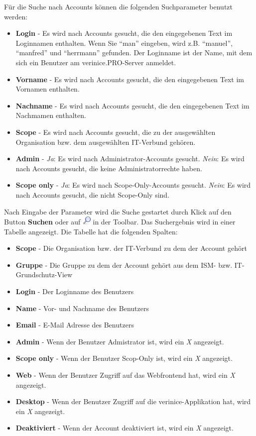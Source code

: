 \documentclass[a4paper,10pt]{book}
\begin{document}
Für die Suche nach Accounts können die folgenden Suchparameter benutzt werden:
\begin{itemize}
\item \textbf{Login} - Es wird nach Accounts gesucht, die den eingegebenen Text
im Loginnamen enthalten. Wenn Sie ``man'' eingeben, wird z.B. ``manuel'',
``manfred'' und ``herrmann'' gefunden. Der Loginname ist der Name, mit dem sich
ein Benutzer am verinice.\textsc{PRO}-Server anmeldet.
\item \textbf{Vorname} - Es wird nach Accounts gesucht, die den eingegebenen
Text im Vornamen enthalten.
\item \textbf{Nachname} - Es wird nach Accounts gesucht, die den eingegebenen
Text im Nachmamen enthalten.
\item \textbf{Scope} - Es wird nach Accounts gesucht, die zu der ausgewählten
Organisation bzw. dem ausgewählten IT-Verbund gehören.
\item \textbf{Admin} - \textit{Ja}: Es wird nach Administrator-Accounts gesucht.
\textit{Nein}: Es wird nach Accounts gesucht, die keine Administratorrechte
haben.
\item \textbf{Scope only} - \textit{Ja}: Es wird nach Scope-Only-Accounts
gesucht. \textit{Nein}: Es wird nach Accounts gesucht, die nicht Scope-Only
sind.
\end{itemize}

Nach Eingabe der Parameter wird die Suche gestartet durch Klick auf den Button \textbf{Suchen} oder auf \includegraphics[height=2ex]{Icon/search.png} in der Toolbar. Das Suchergebnis wird in einer Tabelle angezeigt. Die Tabelle hat die folgenden Spalten:
\begin{itemize}
\item \textbf{Scope} - Die Organisation bzw. der IT-Verbund zu dem der Account gehört
\item \textbf{Gruppe} - Die Gruppe zu dem der Account gehört aus dem ISM- bzw. IT-Grundschutz-View
\item \textbf{Login} - Der Loginname des Benutzers
\item \textbf{Name} - Vor- und Nachname des Benutzers
\item \textbf{Email} - E-Mail Adresse des Benutzers
\item \textbf{Admin} - Wenn der Benutzer Admistrator ist, wird ein \textit{X} angezeigt.
\item \textbf{Scope only} - Wenn der Benutzer Scop-Only ist, wird ein \textit{X} angezeigt.
\item \textbf{Web} - Wenn der Benutzer Zugriff auf das Webfrontend hat, wird ein \textit{X} angezeigt.
\item \textbf{Desktop} - Wenn der Benutzer Zugriff auf die verinice-Applikation hat, wird ein \textit{X} angezeigt.
\item \textbf{Deaktiviert} - Wenn der Account deaktiviert ist, wird ein \textit{X} angezeigt.
\end{itemize}
\end{document}
